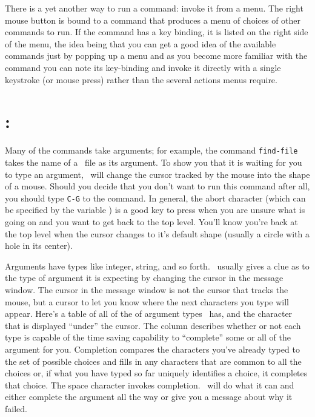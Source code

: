 There is a yet another way to run a command: invoke it from a menu.  The
right mouse button is bound to a command that produces a menu of
choices of other commands to run.
If the command has a key binding, it is listed on the right side of the
menu,
the idea being that you can get a good idea of the
available commands just by popping up a menu and as you become more
familiar with the command you can note its key-binding and 
invoke it directly with a single keystroke (or mouse press)
rather than the several actions menus require.

\section{:}
Many of the commands take arguments; for example, the command
{\tt find-file} takes the name of a \DVI\ file as its argument.
To show you that it is waiting for you to type an argument, \dtl\ will
change the cursor tracked by the mouse into the shape of a mouse.
Should you decide that
you don't want to run this command after all, you should type {\tt C-G}
to  the command.
In general, the abort character (which can be specified by the
variable {\tt {}}) is a good key to press when
you are unsure what is going on and you want to get back to the top
level.  You'll know you're back at the top level when the cursor
changes to it's default shape (usually a circle with a hole in its
center).

Arguments have types like integer, string, and so forth.
\Dtl\ usually gives a clue as to the type of argument it is expecting by
changing the cursor in the message window.
The cursor in the message
window is not the cursor that tracks the mouse, but a cursor to let you
know where the next characters you type will
appear.  
Here's a table of all of the of argument types \dtl\ has,
and the character
that is displayed ``under'' the cursor.
\medskip
{}
\medskip
The  column describes whether or not each type is
capable of the time saving capability to ``complete'' some or all of
the argument for you.  Completion compares the characters you've
already typed to the set of possible choices and fills in any
characters that are common to all the choices or, if what you have
typed so far uniquely identifies a choice, it completes that choice.
The space character invokes completion.
\Dtl\ will do what it can and either complete the argument all the way
or give you a message about why it failed.

